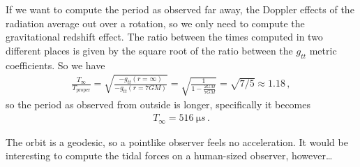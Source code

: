 \documentclass[main.tex]{subfiles}
\begin{document}
If we want to compute the period as observed far away, the Doppler effects of the radiation average out over a rotation, so we only need to compute the gravitational redshift effect. The ratio between the times computed in two different places is given by the square root of the ratio between the \(g_{tt}\) metric coefficients. 
So we have 
%
\begin{align}
  \frac{T_{ \infty }}{T_{\text{proper}}} = \sqrt{\frac{-g_{tt}(r = \infty )}{-g_{tt }(r=7GM)}} = \sqrt{\frac{1}{1-\frac{2GM}{7GM}}} = \sqrt{7/5} \approx \num{1.18}
\,,
\end{align}
%
so the period as observed from outside is longer, specifically it becomes 
%
\begin{align}
  T_{ \infty } = \SI{516}{\micro s}
\,. 
\end{align}

The orbit is a geodesic, so a pointlike observer feels no acceleration. 
It would be interesting to compute the tidal forces on a human-sized observer, however\dots
 
\end{document}
